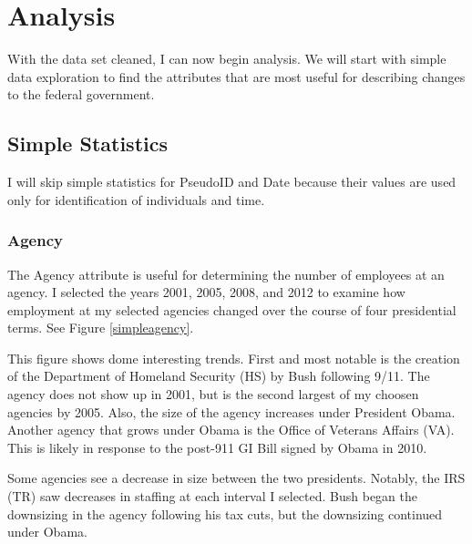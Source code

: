 \documentclass{article}
\begin{document}
\section{Analysis}
With the data set cleaned, I can now begin analysis. We will start with simple data exploration to find the attributes that are most useful for describing changes to the federal government.

    \subsection{Simple Statistics}
    I will skip simple statistics for PseudoID and Date because their values are used only for identification of individuals and time.

        \subsubsection{Agency}
        The Agency attribute is useful for determining the number of employees at an agency. I selected the years 2001, 2005, 2008, and 2012 to examine how employment at my selected agencies changed over the course of four presidential terms. See Figure \ref{simpleagency}.
        \par
        This figure shows dome interesting trends. First and most notable is the creation of the Department of Homeland Security (HS) by Bush following 9/11. The agency does not show up in 2001, but is the second largest of my choosen agencies by 2005. Also, the size of the agency increases under President Obama. Another agency that grows under Obama is the Office of Veterans Affairs (VA). This is likely in response to the post-911 GI Bill signed by Obama in 2010.
        \par
        Some agencies see a decrease in size between the two presidents. Notably, the IRS (TR) saw decreases in staffing at each interval I selected. Bush began the downsizing in the agency following his tax cuts, but the downsizing continued under Obama.
\end{document}
